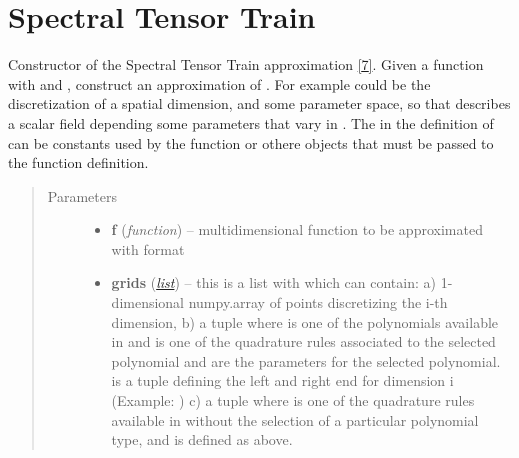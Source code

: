 \documentclass[a4paper,10pt,english]{sphinxmanual}
\begin{document}
\section{Spectral Tensor Train}
\label{api-stt:spectral-tensor-train}\label{api-stt::doc}\label{api-stt:module-TensorToolbox}

\begin{fulllineitems}
\label{api-stt:TensorToolbox.core.STT}
Constructor of the Spectral Tensor Train approximation {\hyperref[zrefs:bigoni2015]{{[}7{]}}}. Given a function 
with  and , construct an approximation of . For example  could be the discretization of a spatial dimension, and  some parameter space, so that  describes a scalar field depending some parameters that vary in . The  in the definition of  can be constants used by the function or othere objects that must be passed to the function definition.
\begin{quote}\begin{description}
\item[{Parameters}] \leavevmode\begin{itemize}
\item {} 
\textbf{f} (\emph{function}) -- multidimensional function to be approximated with format 

\item {} 
\textbf{grids} (\href{http://docs.python.org/library/functions.html\#list}{\emph{list}}) -- this is a list with  which can contain:
a) 1-dimensional numpy.array of points discretizing the i-th dimension,
b) a tuple  where  is one of the polynomials available in  and  is one of the quadrature rules associated to the selected polynomial and  are the parameters for the selected polynomial.  is a tuple defining the left and right end for dimension i (Example: )
c) a tuple  where  is one of the quadrature rules available in  without the selection of a particular polynomial type, and  is defined as above.


\end{itemize}
\end{description}
\end{quote}
\end{fulllineitems}
\end{document}
